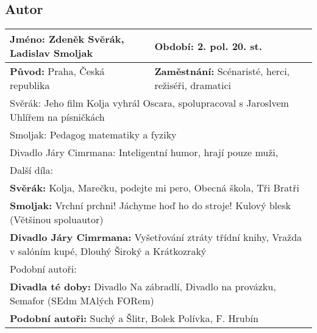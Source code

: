 \subsection*{Autor}
\begin{tabularx}{\linewidth}{l|l}
  \textbf{Jméno:} Zdeněk Svěrák, Ladislav Smoljak & \textbf{Období:} 2. pol. 20. st.                                                      \\
  \hline
  \textbf{Původ:} Praha, Česká republika          & \textbf{Zaměstnání:} Scénaristé, herci, režiséři, dramatici                           \\
  \hline
  \multicolumn{2}{l}{Svěrák: Jeho film Kolja vyhrál Oscara, spolupracoval s Jaroslvem Uhlířem na písničkách}                              \\
  \multicolumn{2}{l}{Smoljak: Pedagog matematiky a fyziky}                                                                                \\
  \multicolumn{2}{l}{Divadlo Járy Cimrmana: Inteligentní humor, hrají pouze muži, }                                                       \\
  \hline
  \multicolumn{2}{l}{Další díla:}                                                                                                         \\
  \multicolumn{2}{l}{\textbf{Svěrák:} Kolja, Marečku, podejte mi pero, Obecná škola, Tři Bratři}                                          \\
  \multicolumn{2}{l}{\textbf{Smoljak:} Vrchní prchni! Jáchyme hoď ho do stroje! Kulový blesk (Většinou spoluautor)}                       \\
  \multicolumn{2}{l}{\textbf{Divadlo Járy Cimrmana:} Vyšetřování ztráty třídní knihy, Vražda v salóním kupé, Dlouhý Široký a Krátkozraký} \\
  \hline
  \multicolumn{2}{l}{Podobní autoři:}                                                                                                     \\
  \multicolumn{2}{l}{\textbf{Divadla té doby:} Divadlo Na zábradlí, Divadlo na provázku, Semafor (SEdm MAlých FORem)}                     \\
  \multicolumn{2}{l}{\textbf{Podobní autoři:} Suchý a Šlitr, Bolek Polívka, F. Hrubín}                                                    \\
\end{tabularx}
